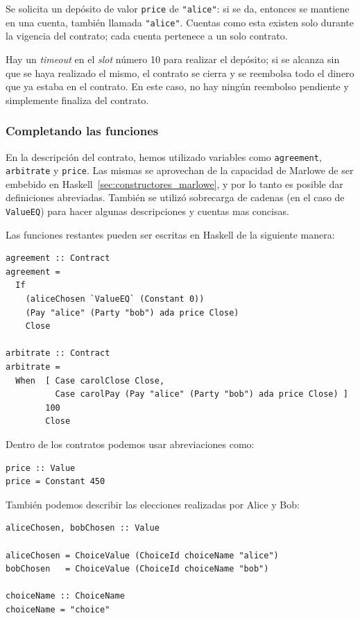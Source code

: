\documentclass[12pt]{book}
\begin{document}
Se solicita un depósito de valor \texttt{price} de \texttt{"{}alice"{}}: si se da, entonces se mantiene en una cuenta, también llamada \texttt{"{}alice"{}}. Cuentas como esta existen solo durante la vigencia del contrato; cada cuenta pertenece a un solo contrato.

Hay un \textit{timeout} en el \textit{slot} número 10 para realizar el depósito; si se alcanza sin que se haya realizado el mismo, el contrato se cierra y se reembolsa todo el dinero que ya estaba en el contrato. En este caso, no hay ningún reembolso pendiente y simplemente finaliza del contrato.

\subsubsection{Completando las funciones}
En la descripción del contrato, hemos utilizado variables como \texttt{agreement}, \texttt{arbitrate} y \texttt{price}. Las mismas se aprovechan de la capacidad de Marlowe de ser embebido en Haskell~\ref{sec:constructores_marlowe}, y por lo tanto es posible dar definiciones abreviadas. También se utilizó sobrecarga de cadenas (en el caso de \texttt{ValueEQ}) para hacer algunas descripciones y cuentas mas concisas.

Las funciones restantes pueden ser escritas en Haskell de la siguiente manera:

\begin{lstlisting}[style=Haskell-cardano, language=Marlowe, caption=Funciones \texttt{agreement} y \texttt{arbitrate}.]
agreement :: Contract
agreement =
  If
    (aliceChosen `ValueEQ` (Constant 0))
    (Pay "alice" (Party "bob") ada price Close)
    Close

arbitrate :: Contract
arbitrate =
  When  [ Case carolClose Close,
          Case carolPay (Pay "alice" (Party "bob") ada price Close) ]
        100
        Close
\end{lstlisting}

Dentro de los contratos podemos usar abreviaciones como:

\begin{lstlisting}[style=Haskell-cardano, language=Marlowe, caption=Funcion \texttt{price}.]
price :: Value
price = Constant 450
\end{lstlisting}


También podemos describir las elecciones realizadas por Alice y Bob:

\begin{lstlisting}[style=Haskell-cardano, language=Marlowe, caption=Definicion de las elecciones.]
aliceChosen, bobChosen :: Value

aliceChosen = ChoiceValue (ChoiceId choiceName "alice")
bobChosen   = ChoiceValue (ChoiceId choiceName "bob")

choiceName :: ChoiceName
choiceName = "choice"
\end{lstlisting}
\end{document}
